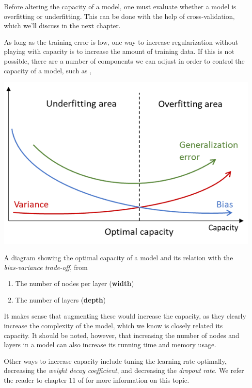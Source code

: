 \documentclass[nobib]{tufte-handout} %
\begin{document}
  Before altering the capacity of a model, one must evaluate whether a model is overfitting or underfitting. This can be done with the help of cross-validation, which we'll discuss in the next chapter.

  As long as the training error is low, one way to increase regularization without playing with capacity is to increase the amount of training data. If this is not possible, there are a number of components we can adjust in order to control the capacity of a model, such as \citep{capacity-Brownlee}, 
\begin{marginfigure}
  \includegraphics{capacity}
  \label{capacity}
  \caption{A diagram showing the optimal capacity of a model and its relation with the \textit{bias-variance trade-off}, from \citep{capacity-Kowalik}}
\end{marginfigure}

  \begin{enumerate}
    \item The number of nodes per layer (\textbf{width}) 
    \item The number of layers (\textbf{depth})
  \end{enumerate}
  It makes sense that augmenting these would increase the capacity, as they clearly increase the complexity of the model, which we know is closely related its capacity. It should be noted, however, that increasing the number of nodes and layers in a model can also increase its running time and memory usage. 

  Other ways to increase capacity include tuning the learning rate optimally, decreasing the \textit{weight decay coefficient}, and decreasing the \textit{dropout rate.} We refer the reader to chapter 11 of \cite{Goodfellow-et-al-2016} for more information on this topic.
\end{document}
